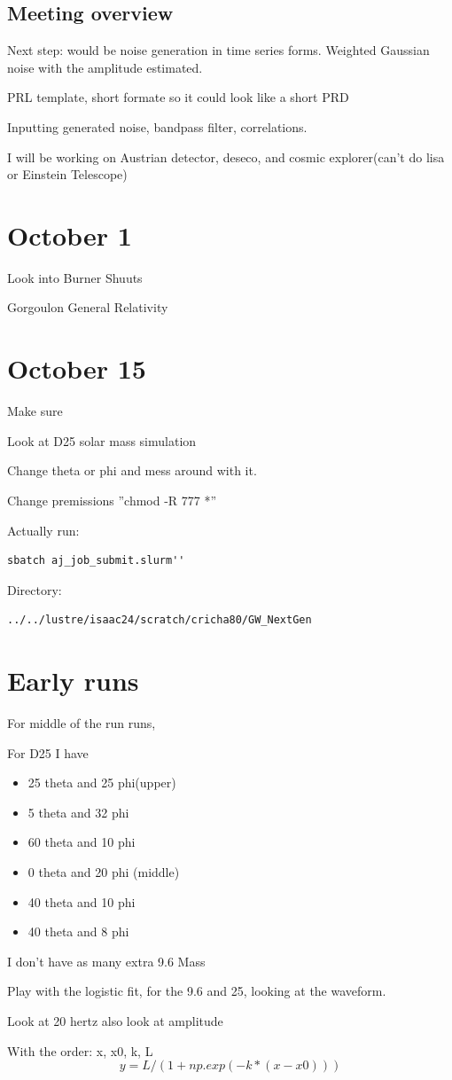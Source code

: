 \subsection{Meeting overview}

Next step: would be noise generation in time series forms. Weighted Gaussian noise with the amplitude estimated.

PRL template, short formate so it could look like a short PRD

Inputting generated noise, bandpass filter, correlations.

I will be working on Austrian detector, deseco, and cosmic explorer(can't do lisa or Einstein Telescope)


\section{October 1}

Look into Burner Shuuts

Gorgoulon General Relativity


\section{October 15}
Make sure

Look at D25 solar mass simulation


Change theta or phi and mess around with it.

Change premissions ''chmod -R 777 *''

Actually run:
\begin{verbatim}
sbatch aj_job_submit.slurm''
\end{verbatim}
Directory:
\begin{verbatim}
../../lustre/isaac24/scratch/cricha80/GW_NextGen
\end{verbatim}
\section{Early runs}

For middle of the run runs,

For D25 I have

\begin{itemize}
  \item 25 theta and 25 phi(upper)
  \item 5 theta and 32 phi
  \item 60 theta and 10 phi
  \item 0 theta and 20 phi (middle)
  \item 40 theta and 10 phi
  \item 40 theta and 8 phi
\end{itemize}

I don't have as many extra 9.6 Mass


Play with the logistic fit, for the 9.6 and 25, looking at the waveform.

Look at 20 hertz also look at amplitude


With the order: x, x0, k, L
\[
y = L / (1 + np.exp(-k * (x - x0)))
\]
